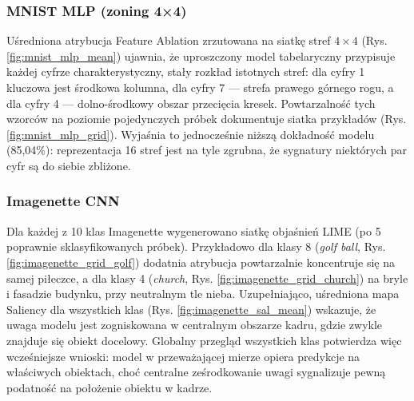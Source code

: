 \documentclass[10pt,journal,compsoc]{IEEEtran}
\begin{document}
\subsubsection{MNIST MLP (zoning 4×4)}
Uśredniona atrybucja Feature Ablation zrzutowana na siatkę stref $4\times4$ (Rys. \ref{fig:mnist_mlp_mean}) ujawnia, że uproszczony model tabelaryczny przypisuje każdej cyfrze charakterystyczny, stały rozkład istotnych stref: dla cyfry 1 kluczowa jest środkowa kolumna, dla cyfry 7 — strefa prawego górnego rogu, a dla cyfry 4 — dolno-środkowy obszar przecięcia kresek. Powtarzalność tych wzorców na poziomie pojedynczych próbek dokumentuje siatka przykładów (Rys. \ref{fig:mnist_mlp_grid}). Wyjaśnia to jednocześnie niższą dokładność modelu (85,04\%): reprezentacja 16 stref jest na tyle zgrubna, że sygnatury niektórych par cyfr są do siebie zbliżone.

\subsubsection{Imagenette CNN}
Dla każdej z 10 klas Imagenette wygenerowano siatkę objaśnień LIME (po 5 poprawnie sklasyfikowanych próbek). Przykładowo dla klasy 8 (\textit{golf ball}, Rys. \ref{fig:imagenette_grid_golf}) dodatnia atrybucja powtarzalnie koncentruje się na samej piłeczce, a dla klasy 4 (\textit{church}, Rys. \ref{fig:imagenette_grid_church}) na bryle i fasadzie budynku, przy neutralnym tle nieba. Uzupełniająco, uśredniona mapa Saliency dla wszystkich klas (Rys. \ref{fig:imagenette_sal_mean}) wskazuje, że uwaga modelu jest zogniskowana w centralnym obszarze kadru, gdzie zwykle znajduje się obiekt docelowy. Globalny przegląd wszystkich klas potwierdza więc wcześniejsze wnioski: model w przeważającej mierze opiera predykcje na właściwych obiektach, choć centralne ześrodkowanie uwagi sygnalizuje pewną podatność na położenie obiektu w kadrze.
\end{document}
